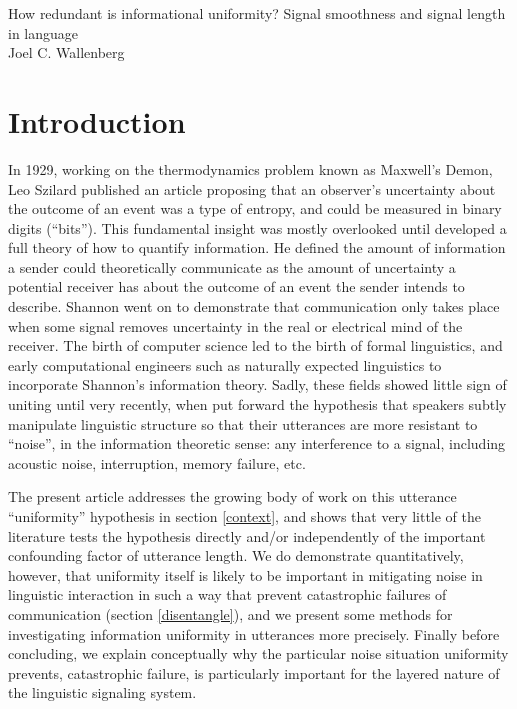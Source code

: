 \documentclass[12pt]{article}
\begin{document}
\noindent How redundant is informational uniformity? Signal smoothness and signal length in language\\
\noindent Joel C. Wallenberg\\

\section{Introduction}

\nocite{shannon1948reprint}
In 1929, working on the thermodynamics problem known as Maxwell's Demon, Leo Szilard published an article proposing that an observer's uncertainty about the outcome of an event was a type of entropy, and could be measured in binary digits (``bits''). This fundamental insight was mostly overlooked until \citet{shannon1948} developed a full theory of how to quantify information. He defined the amount of information a sender could theoretically communicate as the amount of uncertainty a potential receiver has about the outcome of an event the sender intends to describe. Shannon went on to demonstrate that communication only takes place when some signal removes uncertainty in the real or electrical mind of the receiver. The birth of computer science led to the birth of formal linguistics, and early computational engineers such as \citet{pierce1980} naturally expected linguistics to incorporate Shannon's information theory. Sadly, these fields showed little sign of uniting until very recently, when \citet{aylettturk2004} put forward the hypothesis that speakers subtly manipulate linguistic structure so that their utterances are more resistant to ``noise'', in the information theoretic sense: any interference to a signal, including acoustic noise, interruption, memory failure, etc.

The present article addresses the growing body of work on this utterance ``uniformity'' hypothesis in section \ref{context}, and shows that very little of the literature tests the hypothesis directly and/or independently of the important confounding factor of utterance length. We do demonstrate quantitatively, however, that uniformity itself is likely to be important in mitigating noise in linguistic interaction in such a way that prevent catastrophic failures of communication (section \ref{disentangle}), and we present some methods for investigating information uniformity in utterances more precisely. Finally before concluding, we explain conceptually why the particular noise situation uniformity prevents, catastrophic failure, is particularly important for the layered nature of the linguistic signaling system. 
\end{document}
